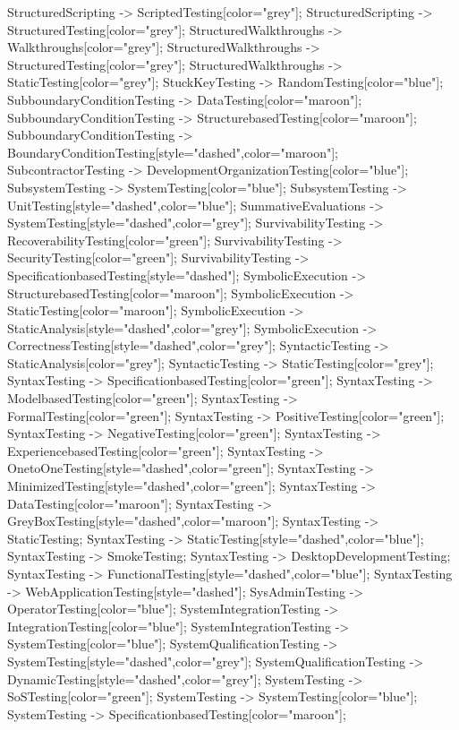 \documentclass{article}
\begin{document}
{StructuredScripting -> ScriptedTesting[color="grey"];
StructuredScripting -> StructuredTesting[color="grey"];
StructuredWalkthroughs -> Walkthroughs[color="grey"];
StructuredWalkthroughs -> StructuredTesting[color="grey"];
StructuredWalkthroughs -> StaticTesting[color="grey"];
StuckKeyTesting -> RandomTesting[color="blue"];
SubboundaryConditionTesting -> DataTesting[color="maroon"];
SubboundaryConditionTesting -> StructurebasedTesting[color="maroon"];
SubboundaryConditionTesting -> BoundaryConditionTesting[style="dashed",color="maroon"];
SubcontractorTesting -> DevelopmentOrganizationTesting[color="blue"];
SubsystemTesting -> SystemTesting[color="blue"];
SubsystemTesting -> UnitTesting[style="dashed",color="blue"];
SummativeEvaluations -> SystemTesting[style="dashed",color="grey"];
SurvivabilityTesting -> RecoverabilityTesting[color="green"];
SurvivabilityTesting -> SecurityTesting[color="green"];
SurvivabilityTesting -> SpecificationbasedTesting[style="dashed"];
SymbolicExecution -> StructurebasedTesting[color="maroon"];
SymbolicExecution -> StaticTesting[color="maroon"];
SymbolicExecution -> StaticAnalysis[style="dashed",color="grey"];
SymbolicExecution -> CorrectnessTesting[style="dashed",color="grey"];
SyntacticTesting -> StaticAnalysis[color="grey"];
SyntacticTesting -> StaticTesting[color="grey"];
SyntaxTesting -> SpecificationbasedTesting[color="green"];
SyntaxTesting -> ModelbasedTesting[color="green"];
SyntaxTesting -> FormalTesting[color="green"];
SyntaxTesting -> PositiveTesting[color="green"];
SyntaxTesting -> NegativeTesting[color="green"];
SyntaxTesting -> ExperiencebasedTesting[color="green"];
SyntaxTesting -> OnetoOneTesting[style="dashed",color="green"];
SyntaxTesting -> MinimizedTesting[style="dashed",color="green"];
SyntaxTesting -> DataTesting[color="maroon"];
SyntaxTesting -> GreyBoxTesting[style="dashed",color="maroon"];
SyntaxTesting -> StaticTesting;
SyntaxTesting -> StaticTesting[style="dashed",color="blue"];
SyntaxTesting -> SmokeTesting;
SyntaxTesting -> DesktopDevelopmentTesting;
SyntaxTesting -> FunctionalTesting[style="dashed",color="blue"];
SyntaxTesting -> WebApplicationTesting[style="dashed"];
SysAdminTesting -> OperatorTesting[color="blue"];
SystemIntegrationTesting -> IntegrationTesting[color="blue"];
SystemIntegrationTesting -> SystemTesting[color="blue"];
SystemQualificationTesting -> SystemTesting[style="dashed",color="grey"];
SystemQualificationTesting -> DynamicTesting[style="dashed",color="grey"];
SystemTesting -> SoSTesting[color="green"];
SystemTesting -> SystemTesting[color="blue"];
SystemTesting -> SpecificationbasedTesting[color="maroon"];
}
\end{document}
